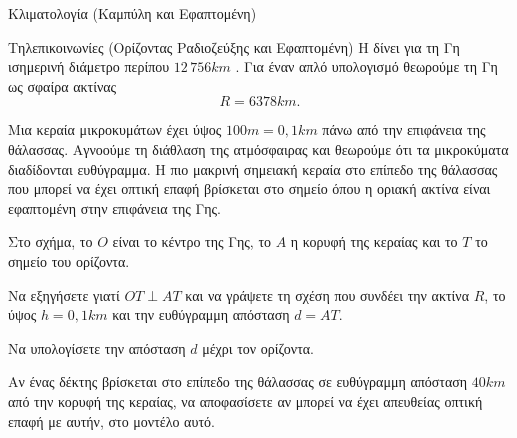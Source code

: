 \begin{problhma}{Κλιματολογία (Καμπύλη  και Εφαπτομένη)}
\begin{center}
\end{center}
\end{problhma}

\begin{problhma}{Τηλεπικοινωνίες (Ορίζοντας Ραδιοζεύξης και Εφαπτομένη)}
Η  δίνει για τη Γη ισημερινή διάμετρο περίπου
$12\,756\si{km}$ \cite{nasaEarthFacts}. Για έναν απλό υπολογισμό
θεωρούμε τη Γη ως σφαίρα ακτίνας
\[
  R=6378\si{km}.
\]

Μια κεραία μικροκυμάτων έχει ύψος $100\si{m}=0{,}1\si{km}$ πάνω από την
επιφάνεια της θάλασσας. Αγνοούμε τη διάθλαση της ατμόσφαιρας και
θεωρούμε ότι τα μικροκύματα διαδίδονται ευθύγραμμα. Η πιο μακρινή
σημειακή κεραία στο επίπεδο της θάλασσας που μπορεί να έχει οπτική
επαφή βρίσκεται στο σημείο όπου η οριακή ακτίνα είναι εφαπτομένη στην
επιφάνεια της Γης.

Στο σχήμα, το $O$ είναι το κέντρο της Γης, το $A$ η κορυφή της κεραίας
και το $T$ το σημείο του ορίζοντα.
\begin{alist}
\item Να εξηγήσετε γιατί $OT\perp AT$ και να γράψετε τη σχέση που
      συνδέει την ακτίνα $R$, το ύψος $h=0{,}1\si{km}$ και την
      ευθύγραμμη απόσταση $d=AT$.
\item Να υπολογίσετε την απόσταση $d$ μέχρι τον ορίζοντα.
\item Αν ένας δέκτης βρίσκεται στο επίπεδο της θάλασσας σε ευθύγραμμη
      απόσταση $40\si{km}$ από την κορυφή της κεραίας, να αποφασίσετε
      αν μπορεί να έχει απευθείας οπτική επαφή με αυτήν, στο μοντέλο
      αυτό.
\end{alist}


\end{problhma}
